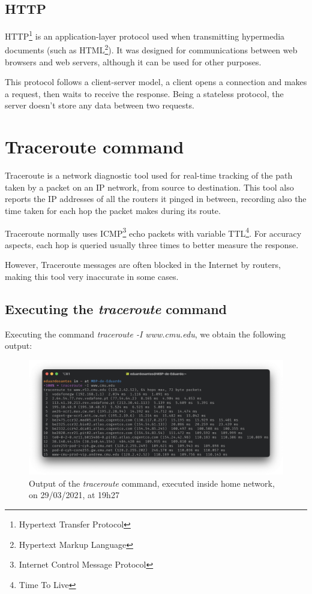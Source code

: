 \documentclass{article}
\newcommand\tab[1][1cm]{\hspace*{#1}}
\begin{document}
\subsection{HTTP}

\tab HTTP\footnote{Hypertext Transfer Protocol} is an application-layer protocol used when transmitting hypermedia documents (such as HTML\footnote{Hypertext Markup Language}). It was designed for communications between web browsers and web servers, although it can be used for other purposes. 

This protocol follows a client-server model, a client opens a connection and makes a request, then waits to receive the response. Being a stateless protocol, the server doesn't store any data between two requests.

\section{Traceroute command}

\tab Traceroute is a network diagnostic tool used for real-time tracking of the path taken by a packet on an IP network, from source to destination. This tool also reports the IP addresses of all the routers it pinged in between, recording also the time taken for each hop the packet makes during its route.

Traceroute normally uses ICMP\footnote{Internet Control Message Protocol} echo packets with variable TTL\footnote{Time To Live}. For accuracy aspects, each hop is queried usually three times to better measure the response. 

However, Traceroute messages are often blocked in the Internet by routers, making this tool very inaccurate in some cases.

\subsection{Executing the \textit{traceroute} command}

\tab Executing the command \textit{traceroute -I www.cmu.edu}, we obtain the following output:

\begin{figure}[H]
    \includegraphics[width=1 \textwidth]{images/tracerouteHome.png}
    \caption{Output of the \textit{traceroute} command, executed inside home network, on 29/03/2021, at 19h27}
\end{figure}
\end{document}
